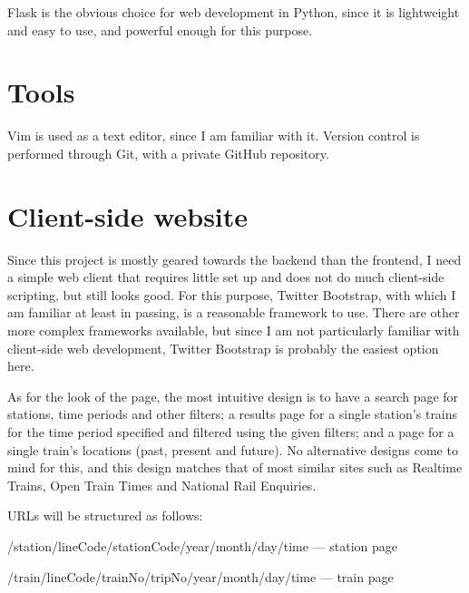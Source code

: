\documentclass[a4paper,12pt,twoside]{report}
\begin{document}
Flask is the obvious choice for web development in Python, since it is
lightweight and easy to use, and powerful enough for this purpose.

\section{Tools}

Vim is used as a text editor, since I am familiar with it. Version control is
performed through Git, with a private GitHub repository.

\section{Client-side website}

Since this project is mostly geared towards the backend than the frontend, I
need a simple web client that requires little set up and does not do much
client-side scripting, but still looks good. For this purpose, Twitter
Bootstrap, with which I am familiar at least in passing, is a reasonable
framework to use. There are other more complex frameworks available, but since
I am not particularly familiar with client-side web development, Twitter
Bootstrap is probably the easiest option here.

As for the look of the page, the most intuitive design is to have a search page
for stations, time periods and other filters; a results page for a single
station's trains for the time period specified and filtered using the given
filters; and a page for a single train's locations (past, present and future).
No alternative designs come to mind for this, and this design matches that of
most similar sites such as Realtime Trains, Open Train Times and National Rail
Enquiries.

URLs will be structured as follows:

/station/lineCode/stationCode/year/month/day/time --- station page

/train/lineCode/trainNo/tripNo/year/month/day/time --- train page
\end{document}
